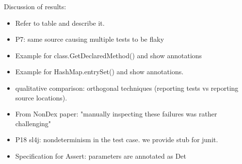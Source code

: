 Discussion of results:

\begin{itemize}
    \item Refer to table and describe it.
    \item P7: same source causing multiple tests to be flaky
    \item Example for class.GetDeclaredMethod() and show annotations
    \item Example for HashMap.entrySet() and show annotations.
    \item qualitative comparison: orthogonal techniques (reporting tests vs reporting source locations).
    \item From NonDex paper: "manually inspecting these failures was rather challenging"
    \item P18 sl4j: nondeterminism in the test case. we provide stub for junit.
    \item Specification for Assert: parameters are annotated as Det
\end{itemize}

